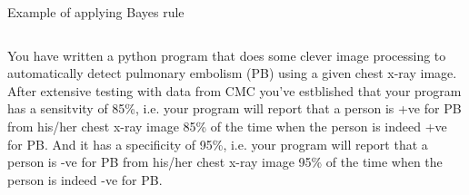 \documentclass[aspectratio=169]{beamer}
\begin{document}
\begin{frame}{Example of applying Bayes rule}
  \begin{columns}
    \begin{column}{0.7\textwidth}
      \vspace{0.25cm}
      
      \begin{small}
        You have written a python program that does some clever image processing to automatically detect pulmonary embolism (PB) using a given chest x-ray image. After extensive testing with data from CMC you've estblished that your program has a sensitvity of 85\%, i.e. your program will report that a person is +ve for PB from his/her chest x-ray image 85\% of the time when the person is indeed +ve for PB. And it has a specificity of 95\%, i.e. your program will report that a person is -ve for PB from his/her chest x-ray image 95\% of the time when the person is indeed -ve for PB. 
        \vspace{0.1cm}
        

\end{small}
\end{column}
\end{columns}
\end{frame}
\end{document}
